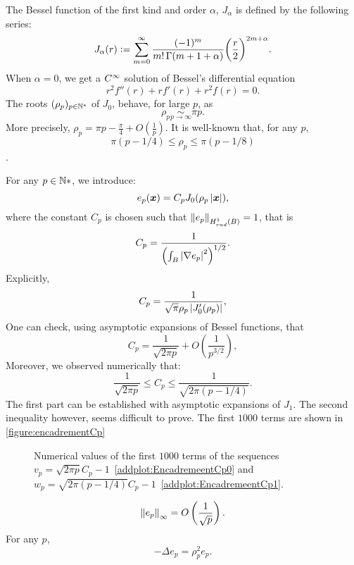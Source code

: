 \documentclass[11pt,a4paper]{article}
\begin{document}
\begin{Def}
	\label{defJ0}
	The Bessel function of the first kind and order $\alpha$, $J_\alpha$ is defined by the following series: 
	\[J_\alpha(r) \mathrel{\mathop:}= \sum_{m=0}^\infty \frac{(-1)^m}{m! \, \Gamma(m+1+\alpha)} {\bigg(\frac{r}{2}\bigg)}^{2m+\alpha}.\]
	When $\alpha=0$, we get a $C^{\infty}$ solution of Bessel's differential equation 
	\begin{equation}
		\label{BesselDifferentialEquation}
		r^2f''(r) + r f'(r) + r^2 f(r) = 0.
	\end{equation}
	The roots $(\rho_p)_{p \in \mathbb{N}^*}$ of $J_0$, behave, for large $p$, as 
	\[ \rho_p \underset{p \to \infty}{\sim} \pi p.\]
	More precisely, $\rho_p = \pi p - \frac{\pi}{4} + O\left(\frac{1}{p}\right)$. It is well-known that, for any $p$, 
	\begin{equation}
		\pi(p - 1/4)\leq \rho_p \leq \pi(p - 1/8)
		\label{EncadrementRhop}
	\end{equation}.
\end{Def}

For any $p\in \mathbb{N}*$, we introduce:
\[e_p(\boldsymbol{x}) = C_p J_0(\rho_p \left\lvert \boldsymbol{x} \right\rvert),\]
where the constant $C_p$ is chosen such that $\left\|e_p\right\|_{H^1_{rad}(B)} = 1$, that is 
\[C_p = \frac{1}{\left(\int_{B} \left\lvert \nabla e_p \right\rvert^2\right)^{1/2}}.\]
Explicitly, 
\[C_p = \dfrac{1}{\sqrt{\pi}\rho_p\left\lvert J_0'(\rho_p) \right\rvert},\]
One can check, using asymptotic expansions of Bessel functions, that
\begin{equation}
	\label{equivalentCp}
	C_p = \dfrac{1}{\sqrt{2 \pi p}} + O\left(\frac{1}{p^{3/2}}\right), 
\end{equation}
Moreover, we observed numerically that:
\begin{equation}
	\label{EncadrementCp}
	\frac{1}{\sqrt{2\pi p}} \leq C_p \leq \frac{1}{\sqrt{2\pi (p-1/4)}}.
\end{equation}
The first part can be established with asymptotic expansions of $J_1$. The second inequality however, seems difficult to prove. The first $1000$ terms are shown in \autoref{figure:encadrementCp}\\
\begin{figure}[H]
	\centering
	
	\captionsetup{width=0.5\textwidth}
	\caption{Numerical values of the first $1000$ terms of the sequences ${v_p = \sqrt{2\pi p}C_p - 1}$~\ref{addplot:EncadremeentCp0} and ${w_p = \sqrt{2\pi (p-1/4)}C_p - 1}$~\ref{addplot:EncadremeentCp1}.}
	\label{figure:encadrementCp}
\end{figure}
\begin{equation}
	\label{estimationNormeInfinieEp}
	\left\|e_p\right\|_{\infty} = O\left(\frac{1}{\sqrt{p}}\right).
\end{equation}
For any $p$, 
\begin{equation}
	\label{epEstUnVP}
	-\Delta e_p = \rho_p^2 e_p.
\end{equation}
\end{document}
